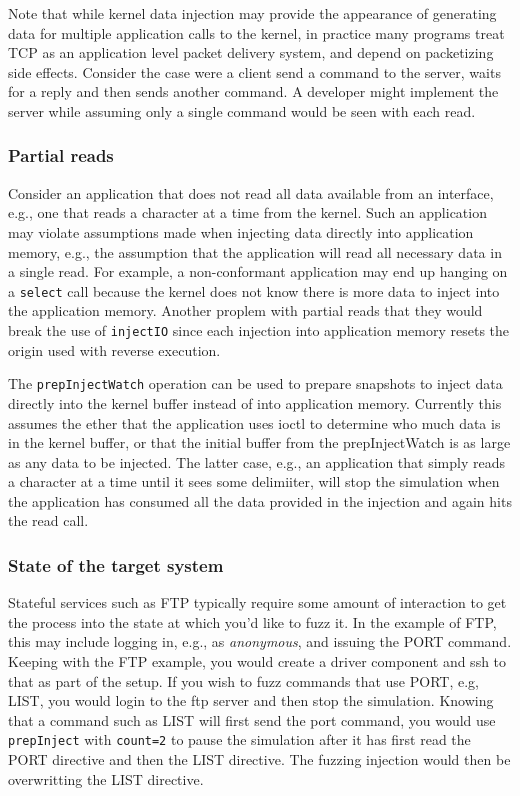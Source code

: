 \documentclass[titlepage]{article}
\begin{document}
Note that while kernel data injection may provide the appearance of generating data for multiple application calls to the kernel, in practice
many programs treat TCP as an application level packet delivery system, and depend on packetizing side effects.  Consider the case were a client
send a command to the server, waits for a reply and then sends another command.  A developer might implement the server while assuming only a
single command would be seen with each read.

\subsubsection{Partial reads}
\label{partial-reads}
Consider an application that does not read all data available from an interface, e.g., one that reads a character at a time from the kernel.  
Such an application may violate assumptions made when injecting data directly into application memory, e.g., the assumption that the application
will read all necessary data in a single read.  For example, a non-conformant application may end up hanging on a {\tt select} call because
the kernel does not know there is more data to inject into the application memory.  Another proplem with partial reads that they would break
the use of {\tt injectIO} since each injection into application memory resets the origin used with reverse execution.

The {\tt prepInjectWatch} operation can be used to
prepare snapshots to inject data directly into the kernel buffer instead of into application memory.  Currently this assumes the ether that the application uses
ioctl to determine who much data is in the kernel buffer, or that the initial buffer from the prepInjectWatch is as large as any data to be injected.
The latter case, e.g., an application that simply reads a character at a time until it sees some delimiiter, will stop the simulation when the application
has consumed all the data provided in the injection and again hits the read call.


\subsubsection{State of the target system}
Stateful services such as FTP typically require some amount of interaction to get the process into the state at which you'd like to fuzz it.
In the example of FTP, this may include logging in, e.g., as \textit{anonymous}, and issuing the PORT command.  Keeping with the FTP example,
you would create a driver component and ssh to that as part of the setup.  If you wish to fuzz commands that use PORT, e.g, LIST, you would
login to the ftp server and then stop the simulation.  Knowing that a command such as LIST will first send the port command, you would use
{\tt prepInject} with {\tt count=2} to pause the simulation after it has first read the PORT directive and then the LIST directive.  The fuzzing
injection would then be overwritting the LIST directive.
\end{document}
